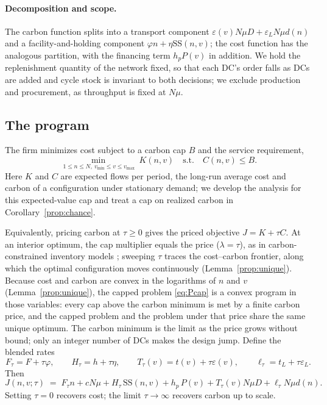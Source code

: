 \documentclass[11pt]{article}
\numberwithin{proposition}{section}
\theoremstyle{definition}
\theoremstyle{remark}
\theoremstyle{plain}
\newcommand{\sstock}{\mathrm{SS}}
\begin{document}
\paragraph{Decomposition and scope.} The carbon function splits into a transport component
$\varepsilon(v)N\mu D+\varepsilon_LN\mu d(n)$ and a facility-and-holding component $\varphi n+\eta\sstock(n,v)$;
the cost function has the analogous partition, with the financing term $h_pP(v)$ in addition. We hold the replenishment quantity of the network fixed, so that each DC's order falls as DCs are added
and cycle stock is invariant to both decisions; we exclude production and procurement, as throughput is fixed
at $N\mu$.

\subsection{The program}

The firm minimizes cost subject to a carbon cap $B$ and the service requirement,
\begin{equation}\label{eq:Pcap}
  \min_{\,1\le n\le N,\ v_{\min}\le v\le v_{\max}}\ K(n,v)
  \quad\text{s.t.}\quad C(n,v)\le B .
\end{equation}
Here $K$ and $C$ are expected flows per period, the long-run average cost and carbon of a configuration under
stationary demand; we develop the analysis for this expected-value cap and treat a cap on realized carbon in
Corollary~\ref{prop:chance}.

Equivalently, pricing carbon at $\tau \ge 0$ gives the priced objective $J=K+\tau C$. At an interior optimum,
the cap multiplier equals the price ($\lambda=\tau$), as in carbon-constrained inventory models
\citep{chen2013carbon}; sweeping $\tau$ traces the cost--carbon frontier, along which the optimal configuration moves continuously
(Lemma~\ref{prop:unique}). Because cost and carbon are convex in the logarithms of $n$ and $v$
(Lemma~\ref{prop:unique}), the capped problem \eqref{eq:Pcap} is a convex program in those variables: every
cap above the carbon minimum is met by a finite carbon price, and the capped problem and the problem under that
price share the same unique optimum. The carbon minimum is the limit as the price grows without bound; only an
integer number of DCs makes the design jump. Define the blended rates
\[
  F_\tau=F+\tau\varphi,\qquad H_\tau=h+\tau\eta,\qquad
  T_\tau(v)=t(v)+\tau\varepsilon(v),\qquad
  \ell_\tau=t_L+\tau\varepsilon_L .
\]
Then
\begin{equation}\label{eq:J}
    J(n,v;\tau) \;=\; F_\tau n + cN\mu + H_\tau\,\sstock(n,v) + h_p\,P(v)
     + T_\tau(v)N\mu D + \ell_\tau N\mu d(n).
\end{equation}
 Setting $\tau=0$ recovers cost;
the limit $\tau\to\infty$ recovers carbon up to scale.
\end{document}
